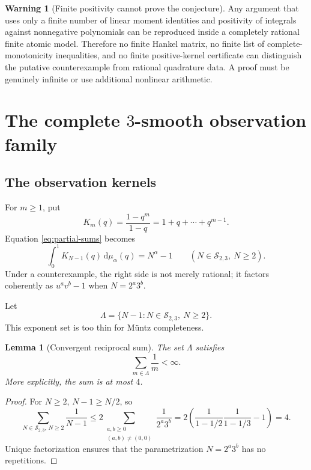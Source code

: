 \documentclass[11pt,oneside]{article}
\newtheorem{lemma}[theorem]{Lemma}
\theoremstyle{definition}
\newtheorem{warning}[theorem]{Warning}
\theoremstyle{remark}
\newcommand{\Ssmooth}{\mathcal S_{2,3}}
\newcommand{\dd}{\,\mathrm d}
\begin{document}
\begin{warning}[Finite positivity cannot prove the conjecture]
Any argument that uses only a finite number of linear moment identities and positivity of
integrals against nonnegative polynomials can be reproduced inside a completely rational
finite atomic model.  Therefore no finite Hankel matrix, no finite list of complete-monotonicity
inequalities, and no finite positive-kernel certificate can distinguish the putative
counterexample from rational quadrature data.  A proof must be genuinely infinite or use
additional nonlinear arithmetic.
\end{warning}

\section{The complete \texorpdfstring{$3$}{3}-smooth observation family}

\subsection{The observation kernels}

For $m\ge1$, put
\begin{equation}\label{eq:Km}
 K_m(q)=\frac{1-q^m}{1-q}=1+q+\cdots+q^{m-1}.
\end{equation}
Equation \eqref{eq:partial-sums} becomes
\begin{equation}\label{eq:Km-data}
 \int_0^1K_{N-1}(q)\dd\mu_\alpha(q)=N^\alpha-1
 \qquad(N\in\Ssmooth,\ N\ge2).
\end{equation}
Under a counterexample, the right side is not merely rational; it factors coherently as
$u^av^b-1$ when $N=2^a3^b$.

Let
\begin{equation}\label{eq:Lambda}
 \Lambda=\{N-1:N\in\Ssmooth,\ N\ge2\}.
\end{equation}
This exponent set is too thin for M\"untz completeness.

\begin{lemma}[Convergent reciprocal sum]\label{lem:reciprocal-sum}
The set $\Lambda$ satisfies
\begin{equation}\label{eq:sum-convergent}
 \sum_{m\in\Lambda}\frac1m<\infty.
\end{equation}
More explicitly, the sum is at most $4$.
\end{lemma}

\begin{proof}
For $N\ge2$, $N-1\ge N/2$, so
\[
 \sum_{N\in\Ssmooth,\,N\ge2}\frac1{N-1}
 \le2\sum_{\substack{a,b\ge0\\(a,b)\ne(0,0)}}\frac1{2^a3^b}
 =2\left(\frac1{1-1/2}\frac1{1-1/3}-1\right)=4.
\]
Unique factorization ensures that the parametrization $N=2^a3^b$ has no repetitions.
\end{proof}
\end{document}
